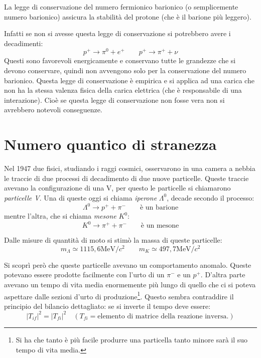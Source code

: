 La legge di conservazione del numero fermionico barionico (o semplicemente numero barionico) assicura la
stabilità del protone (che è il barione più leggero).

Infatti se non si avesse questa legge di conservazione si potrebbero avere i decadimenti:
\[
p^+\rightarrow \pi^0+e^+\qquad p^+\rightarrow \pi^++\nu
\]
Questi sono favorevoli energicamente e conservano tutte le grandezze che si devono conservare, quindi non
avvengono solo per la conservazione del numero barionico.
Questa legge di conservazione è empirica e si applica ad una carica che non ha la stessa valenza fisica della
carica elettrica (che è responsabile di una interazione).
Cioè se questa legge di conservazione non fosse vera non si avrebbero notevoli conseguenze.

\section{Numero quantico di stranezza}
Nel 1947 due fisici, studiando i raggi cosmici, osservarono in una camera a
nebbia le traccie di due processi di decadimento di due nuove particelle.
Queste traccie avevano la configurazione di una V, per questo le particelle si
chiamarono \textit{particelle V}.
Una di queste oggi si chiama \textit{iperone} $\Lambda^0$, decade secondo il
processo:
\[
\Lambda^0\rightarrow p^++\pi^-\qquad\text{è un barione}
\]
mentre l'altra, che si chiama \textit{mesone} $K^0$:
\[
K^0\rightarrow \pi^++\pi^-\qquad\text{è un mesone}
\]

Dalle misure di quantità di moto si stimò la massa di queste particelle:
\[
m_{\Lambda}\simeq 1115,6 \si{\mega\electronvolt}/c^2\qquad m_K\simeq 497,7\si{\mega\electronvolt}/c^2
\]

Si scoprì però che queste particelle avevano un comportamento anomalo.
Queste potevano essere prodotte facilmente con l'urto di un $\pi^-$ e un $p^+$.
D'altra parte avevano un tempo di vita media enormemente più lungo di quello che
ci si poteva aspettare dalle sezioni d'urto di produzione\footnote{Si ha che
tanto è più facile produrre una particella tanto minore sarà il suo tempo di
vita media.}.
Questo sembra contraddire il principio del bilancio dettagliato: se si inverte
il tempo deve essere:
\[
|T_{if}|^2=|T_{fi}|^2\quad (T_{fi}=\text{elemento di matrice della reazione inversa.})
\]

